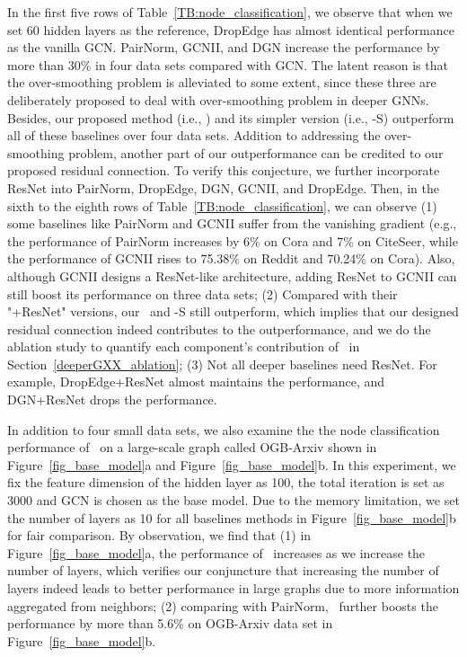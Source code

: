 In the first five rows of Table~\ref{TB:node_classification}, we observe that when we set 60 hidden layers as the reference, DropEdge has almost identical performance as the vanilla GCN. PairNorm, GCNII, and DGN increase the performance by more than 30\% in four data sets compared with GCN. The latent reason is that the over-smoothing problem is alleviated to some extent, since these three are deliberately proposed to deal with over-smoothing problem in deeper GNNs.
Besides, our proposed method (i.e., \name) and its simpler version (i.e., \name-S) outperform all of these baselines over four data sets.
Addition to addressing the over-smoothing problem, another part of our outperformance can be credited to our proposed residual connection.
To verify this conjecture, we further incorporate ResNet into PairNorm, DropEdge, DGN, GCNII, and DropEdge. Then, in the sixth to the eighth rows of Table~\ref{TB:node_classification}, we can observe (1) some baselines like PairNorm and GCNII suffer from the vanishing gradient (e.g., the performance of PairNorm increases by 6\% on Cora and 7\% on CiteSeer, while the performance of GCNII rises to 75.38\% on Reddit and 70.24\% on Cora). Also, although GCNII designs a ResNet-like architecture, adding ResNet to GCNII can still boost its performance on three data sets; (2) Compared with their "+ResNet" versions, our \name\ and \name-S still outperform, which implies that our designed residual connection indeed contributes to the outperformance, and we do the ablation study to quantify each component's contribution of \name\ in Section~\ref{deeperGXX_ablation}; (3) Not all deeper baselines need ResNet. For example, DropEdge+ResNet almost maintains the performance, and DGN+ResNet drops the performance.




In addition to four small data sets, we also examine the the node classification performance of \name\ on a large-scale graph called OGB-Arxiv shown in Figure~\ref{fig_base_model}a and Figure~\ref{fig_base_model}b. In this experiment, we fix the feature dimension of the hidden layer as 100, the total iteration is set as 3000 and GCN is chosen as the base model. Due to the memory limitation, we set the number of layers as 10 for all baselines methods in Figure~\ref{fig_base_model}b for fair comparison. By observation, we find that (1) in Figure~\ref{fig_base_model}a, the performance of \name\ increases as we increase the number of layers, which verifies our conjuncture that increasing the number of layers indeed leads to better performance in large graphs due to more information aggregated from neighbors; (2) comparing with PairNorm, \name\ further boosts the performance by more than 5.6\% on OGB-Arxiv data set in Figure~\ref{fig_base_model}b.




